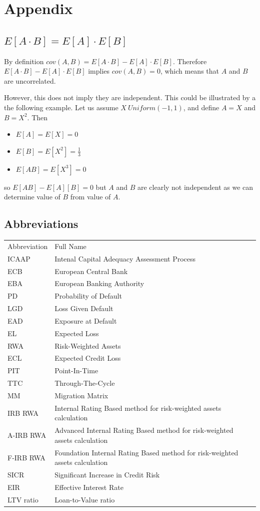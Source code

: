 \documentclass[11pt,a4paper]{article}
\begin{document}
\section{Appendix}

\subsection{$E[A \cdot B] = E[A] \cdot E[B]$}

By definition $cov(A, B) = E[A \cdot B] - E[A] \cdot E[B]$. Therefore $E[A \cdot B] - E[A] \cdot E[B]$ implies $cov(A, B) = 0$, which means that $A$ and $B$ are uncorrelated.

However, this does not imply they are independent. This could be illustrated by a the following example. Let us assume $X ~ Uniform(-1, 1)$, and define $A = X$ and $B = X^2$. Then
\begin{itemize}
\item $E[A] = E[X] = 0$
\item $E[B] = E[X^2] = \frac{1}{3}$
\item $E[AB] = E[X^3] = 0$
\end{itemize}
so $E[AB] - E[A][B] = 0$ but $A$ and $B$ are clearly not independent as we can determine value of $B$ from value of $A$.

\subsection{Abbreviations}

\begin{center}
\begin{tabular}{ll}
Abbreviation & Full Name\\[5pt]
ICAAP & Intenal Capital Adequacy Assessment Process\\
ECB & European Central Bank \\
EBA & European Banking Authority\\
PD & Probability of Default\\
LGD & Loss Given Default\\
EAD & Exposure at Default\\
EL & Expected Loss\\
RWA & Risk-Weighted Assets\\
ECL & Expected Credit Loss\\
PIT & Point-In-Time\\
TTC & Through-The-Cycle\\
MM & Migration Matrix\\
IRB RWA & Internal Rating Based method for risk-weighted assets calculation\\
A-IRB RWA & Advanced Internal Rating Based method for risk-weighted assets calculation\\
F-IRB RWA & Foundation Internal Rating Based method for risk-weighted assets calculation\\
SICR & Significant Increase in Credit Risk\\
EIR & Effective Interest Rate\\
LTV ratio & Loan-to-Value ratio
\end{tabular}
\end{center}
\end{document}

